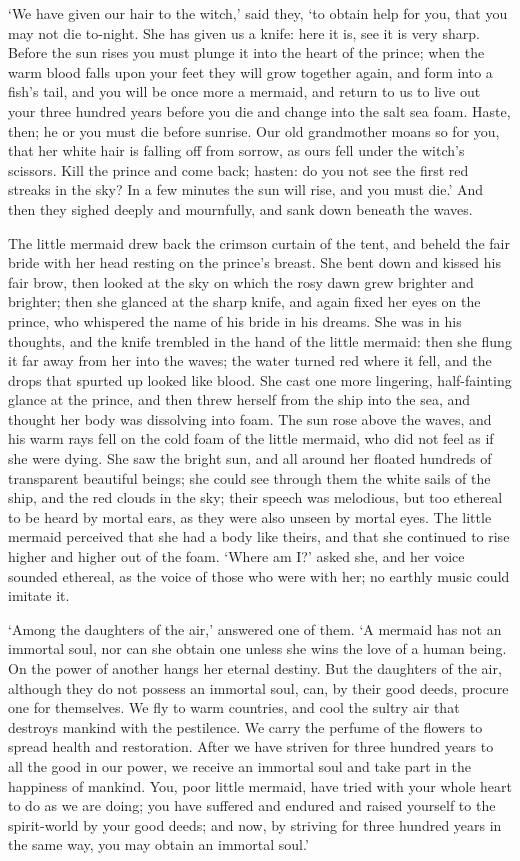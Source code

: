 `We have given our hair to the witch,' said they, `to obtain help for you, that you may not die to-night.
She has given us a knife: here it is, see it is very sharp.
Before the sun rises you must plunge it into the heart of the prince; when the warm blood falls upon your feet they will grow together again, and form into a fish’s tail, and you will be once more a mermaid, and return to us to live out your three hundred years before you die and change into the salt sea foam.
Haste, then; he or you must die before sunrise.
Our old grandmother moans so for you, that her white hair is falling off from sorrow, as ours fell under the witch’s scissors.
Kill the prince and come back; hasten: do you not see the first red streaks in the sky? In a few minutes the sun will rise, and you must die.' And then they sighed deeply and mournfully, and sank down beneath the waves.

The little mermaid drew back the crimson curtain of the tent, and beheld the fair bride with her head resting on the prince’s breast.
She bent down and kissed his fair brow, then looked at the sky on which the rosy dawn grew brighter and brighter; then she glanced at the sharp knife, and again fixed her eyes on the prince, who whispered the name of his bride in his dreams.
She was in his thoughts, and the knife trembled in the hand of the little mermaid: then she flung it far away from her into the waves; the water turned red where it fell, and the drops that spurted up looked like blood.
She cast one more lingering, half-fainting glance at the prince, and then threw herself from the ship into the sea, and thought her body was dissolving into foam.
The sun rose above the waves, and his warm rays fell on the cold foam of the little mermaid, who did not feel as if she were dying.
She saw the bright sun, and all around her floated hundreds of transparent beautiful beings; she could see through them the white sails of the ship, and the red clouds in the sky; their speech was melodious, but too ethereal to be heard by mortal ears, as they were also unseen by mortal eyes.
The little mermaid perceived that she had a body like theirs, and that she continued to rise higher and higher out of the foam.
`Where am I?' asked she, and her voice sounded ethereal, as the voice of those who were with her; no earthly music could imitate it.

`Among the daughters of the air,' answered one of them.
`A mermaid has not an immortal soul, nor can she obtain one unless she wins the love of a human being.
On the power of another hangs her eternal destiny.
But the daughters of the air, although they do not possess an immortal soul, can, by their good deeds, procure one for themselves.
We fly to warm countries, and cool the sultry air that destroys mankind with the pestilence.
We carry the perfume of the flowers to spread health and restoration.
After we have striven for three hundred years to all the good in our power, we receive an immortal soul and take part in the happiness of mankind.
You, poor little mermaid, have tried with your whole heart to do as we are doing; you have suffered and endured and raised yourself to the spirit-world by your good deeds; and now, by striving for three hundred years in the same way, you may obtain an immortal soul.'

